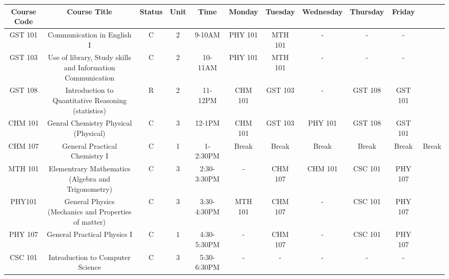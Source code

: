 \documentclass{article}
\begin{document}
	\begin{center}
		\begin{sidewaystable}[h!]
			\begin{tabular}{c|c|c|c|c|c|c|c|c|c|c}
					\textbf{Course Code} & \textbf{Course Title} & \textbf{Status} & \textbf{Unit} & \textbf{Time} & \textbf{Monday} & \textbf{Tuesday} & \textbf{Wednesday} & \textbf{Thursday} & \textbf{Friday} \\
					\hline
					\cellcolor{blue!25}GST 101 & \cellcolor{red!15}Communication in English I & C & 2 & 9-10AM & PHY 101 & MTH 101 & - & - & - \\
					\hline
					\cellcolor{green!35}GST 103 & \cellcolor{red!15}Use of library, Study skills and Information Communication & C & 2 & 10-11AM & PHY 101 & MTH 101 & - & - & - \\
					\hline
					\cellcolor{blue!25}GST 108 &  \cellcolor{red!25}Introduction to Quantitative Reasoning (statistics) & R & 2 & 11-12PM & CHM 101 & GST 103 & - & GST 108 & GST 101 \\
					\cellcolor{green!35}CHM 101 & \cellcolor{red!35} Genral Chemistry Physical (Physical) & C & 3 & 12-1PM & CHM 101 & GST 103 & PHY 101 & GST 108 & GST 101 \\
					\hline
					\cellcolor{blue!25}CHM 107 &\cellcolor{red!45} General Practical Chemistry I & C & 1 & 1-2:30PM & \cellcolor{yellow!25}Break & \cellcolor{yellow!25}Break & \cellcolor{yellow!25}Break & \cellcolor{yellow!25}Break &
					\cellcolor{yellow!25}Break &
					\cellcolor{yellow!25}Break \\
					\hline
					\cellcolor{green!35}MTH 101 & \cellcolor{red!55}Elementrary Mathematics (Algebra and Trigonometry) & C & 3 & 2:30-3:30PM & - & CHM 107 & CHM 101 & CSC 101 & PHY 107 \\
					\hline
					\cellcolor{blue!25}PHY101 & \cellcolor{red!55}General Physics (Mechanics and Properties of matter) & C & 3 & 3:30-4:30PM & MTH 101 & CHM 107 & - & CSC 101 & PHY 107 \\
					\cellcolor{green!35}PHY 107 & \cellcolor{red!65}General Practical Physics I & C & 1 & 4:30-5:30PM & - & CHM 107 & - & CSC 101 & PHY 107 \\
					\hline
					\cellcolor{blue!25}CSC 101 & \cellcolor{red!65}Introduction to Computer Science & C & 3 & 5:30-6:30PM & - & - & - & - & - \\
					
			\end{tabular}
		\end{sidewaystable}
	\end{center}
\end{document}
